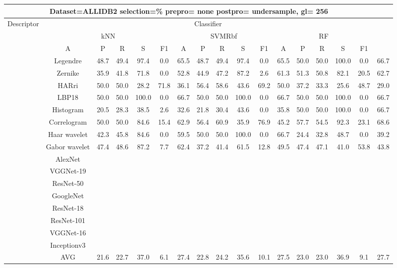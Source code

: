 \documentclass[12pt,italian]{article}
\begin{document}
\begin{tiny}
\begin{longtable}{lcccccccccccccccc}
\toprule
\multicolumn{16}{c}{Dataset=ALLIDB2 selection=\% prepro= none postpro= undersample, gl= 256} \\ 
\toprule
Descriptor & \multicolumn{15}{c}{Classifier} \\ 
& \multicolumn{5}{c}{kNN} & \multicolumn{5}{c}{SVMRbf} & \multicolumn{5}{c}{RF} \\ 
& A & P & R & S & F1 & A & P & R & S & F1 & A & P & R & S & F1 \\ 
\midrule
& Legendre & 48.7 & 49.4 & 97.4 &  0.0 & 65.5 & 48.7 & 49.4 & 97.4 &  0.0 & 65.5 & 50.0 & 50.0 & 100.0 &  0.0 & 66.7 \\ 
& Zernike & 35.9 & 41.8 & 71.8 &  0.0 & 52.8 & 44.9 & 47.2 & 87.2 &  2.6 & 61.3 & 51.3 & 50.8 & 82.1 & 20.5 & 62.7 \\ 
& HARri & 50.0 & 50.0 & 28.2 & 71.8 & 36.1 & 56.4 & 58.6 & 43.6 & 69.2 & 50.0 & 37.2 & 33.3 & 25.6 & 48.7 & 29.0 \\ 
& LBP18 & 50.0 & 50.0 & 100.0 &  0.0 & 66.7 & 50.0 & 50.0 & 100.0 &  0.0 & 66.7 & 50.0 & 50.0 & 100.0 &  0.0 & 66.7 \\ 
& Histogram & 20.5 & 28.3 & 38.5 &  2.6 & 32.6 & 21.8 & 30.4 & 43.6 &  0.0 & 35.8 & 50.0 & 50.0 & 100.0 &  0.0 & 66.7 \\ 
& Correlogram & 50.0 & 50.0 & 84.6 & 15.4 & 62.9 & 56.4 & 60.9 & 35.9 & 76.9 & 45.2 & 57.7 & 54.5 & 92.3 & 23.1 & 68.6 \\ 
& Haar wavelet & 42.3 & 45.8 & 84.6 &  0.0 & 59.5 & 50.0 & 50.0 & 100.0 &  0.0 & 66.7 & 24.4 & 32.8 & 48.7 &  0.0 & 39.2 \\ 
& Gabor wavelet & 47.4 & 48.6 & 87.2 &  7.7 & 62.4 & 37.2 & 41.4 & 61.5 & 12.8 & 49.5 & 47.4 & 47.1 & 41.0 & 53.8 & 43.8 \\ 
& AlexNet \\ 
& VGGNet-19 \\ 
& ResNet-50 \\ 
& GoogleNet \\ 
& ResNet-18 \\ 
& ResNet-101 \\ 
& VGGNet-16 \\ 
& Inceptionv3 \\ 
\hline
& AVG & 21.6 & 22.7 & 37.0 &  6.1 & 27.4 & 22.8 & 24.2 & 35.6 & 10.1 & 27.5 & 23.0 & 23.0 & 36.9 &  9.1 & 27.7 \\ 
\hline
\bottomrule
\end{longtable} 


\end{tiny}
\end{document}
